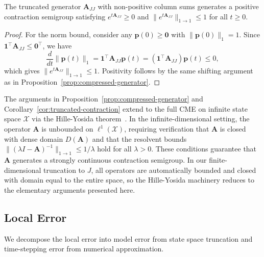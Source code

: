 \documentclass[review,onefignum,onetabnum]{siamart171218}
\begin{document}
\begin{corollary}
\label{cor:truncated-contraction}
The truncated generator $\mathbf{A}_{JJ}$ with non-positive column sums generates a positive contraction semigroup satisfying $e^{t\mathbf{A}_{JJ}} \geq 0$ and $\|e^{t\mathbf{A}_{JJ}}\|_{1 \to 1} \le 1$ for all $t \ge 0$.
\end{corollary}

\begin{proof}
For the norm bound, consider any $\boldsymbol{p}(0) \geq \mathbf{0}$ with $\|\boldsymbol{p}(0)\|_1 = 1$. Since $\mathbf{1}^\top \mathbf{A}_{JJ} \leq \mathbf{0}^\top$, we have
\begin{equation}
\frac{d}{dt}\|\boldsymbol{p}(t)\|_1 = \mathbf{1}^\top \mathbf{A}_{JJ}\boldsymbol{p}(t) = (\mathbf{1}^\top \mathbf{A}_{JJ})\boldsymbol{p}(t) \leq 0,
\end{equation}
which gives $\|e^{t\mathbf{A}_{JJ}}\|_{1 \to 1} \leq 1$. Positivity follows by the same shifting argument as in Proposition~\ref{prop:compressed-generator}.
\end{proof}

\begin{remark}
\label{rem:infinite-dimensional}
The arguments in Proposition~\ref{prop:compressed-generator} and Corollary~\ref{cor:truncated-contraction} extend to the full CME on infinite state space $\mathcal{X}$ via the Hille-Yosida theorem~\cite{Ethier1986,Pazy1983}. In the infinite-dimensional setting, the operator $\mathbf{A}$ is unbounded on $\ell^1(\mathcal{X})$, requiring verification that $\mathbf{A}$ is closed with dense domain $D(\mathbf{A})$ and that the resolvent bounds $\|(\lambda I - \mathbf{A})^{-1}\|_{1 \to 1} \leq 1/\lambda$ hold for all $\lambda > 0$. These conditions guarantee that $\mathbf{A}$ generates a strongly continuous contraction semigroup. In our finite-dimensional truncation to $J$, all operators are automatically bounded and closed with domain equal to the entire space, so the Hille-Yosida machinery reduces to the elementary arguments presented here.
\end{remark}

\subsection{Local Error}

We decompose the local error into model error from state space truncation and time-stepping error from numerical approximation.
\end{document}
